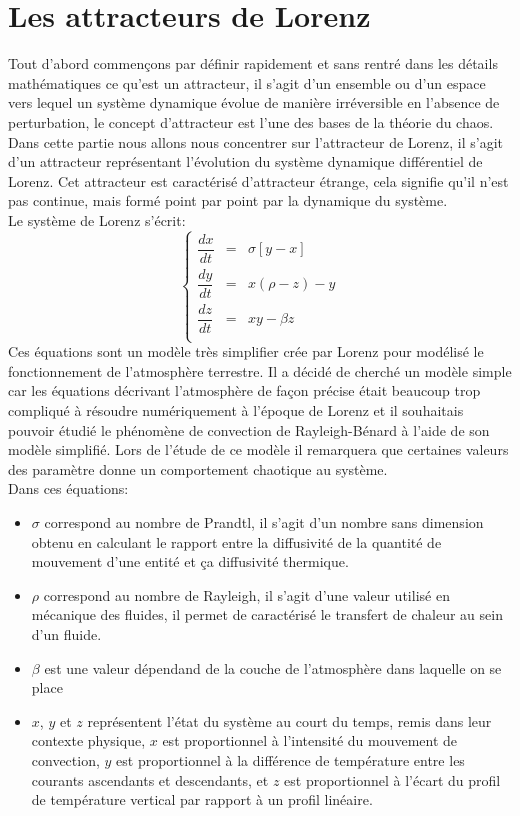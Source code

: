 \chapter{Les attracteurs de Lorenz}
Tout d’abord commençons par définir rapidement et sans rentré dans les détails mathématiques ce qu’est un attracteur,
 il s’agit d’un ensemble ou d’un espace vers lequel un système dynamique évolue de manière
 irréversible en l’absence de perturbation, le concept d’attracteur est l’une des bases de la théorie du chaos. 
 Dans cette partie nous allons nous concentrer sur l’attracteur de Lorenz, il s’agit d’un attracteur
représentant l’évolution du système dynamique différentiel de Lorenz. Cet attracteur est caractérisé d'attracteur étrange, cela signifie qu'il n'est pas continue, mais formé point par point par la dynamique du système.\\

Le système de Lorenz s'écrit: 
\[
    \left\{
    \begin{array}{rcl}
        \dfrac{dx}{dt}&=&\sigma[y-x]\\
        \dfrac{dy}{dt}&=&x(\rho-z)-y\\
        \dfrac{dz}{dt}&=&xy-\beta z\\
    \end{array}
    \right.
\]
Ces équations sont un modèle très simplifier crée par Lorenz pour modélisé le fonctionnement 
de l’atmosphère terrestre. Il a décidé de cherché un modèle simple car 
les équations décrivant l’atmosphère de façon précise était beaucoup trop compliqué à résoudre
 numériquement à l’époque de Lorenz et il souhaitais pouvoir étudié  le phénomène de convection
de Rayleigh-Bénard à l’aide de son modèle simplifié. Lors de l'étude de ce modèle il remarquera que certaines valeurs des paramètre donne un comportement
chaotique au système.\\


Dans ces équations:
\begin{itemize}
    \item $\sigma$ correspond au nombre de Prandtl, il s'agit d'un nombre sans dimension obtenu en calculant le rapport entre la diffusivité de la quantité de mouvement d'une entité et ça diffusivité thermique.
    \item $\rho$ correspond au nombre de Rayleigh, il s'agit d'une valeur utilisé en mécanique des fluides, il permet de caractérisé le transfert de chaleur au sein d'un fluide.
    \item $\beta $  est une valeur dépendand de la couche de l'atmosphère dans laquelle on se place
    \item $x$, $y$ et $z$ représentent l'état du système au court du temps, remis dans leur contexte physique, $x$ est proportionnel à l'intensité du mouvement de convection, $y$ est proportionnel à la différence de température entre les courants ascendants et descendants, et $z$ est proportionnel à l'écart du profil de température vertical par rapport à un profil linéaire.
\end{itemize}


